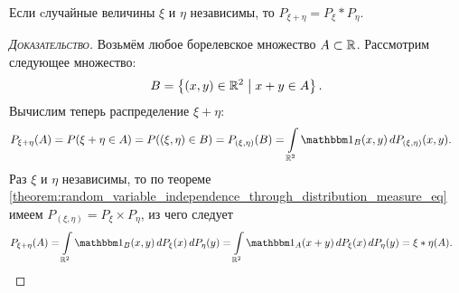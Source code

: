 \documentclass[../main.tex]{subfiles}
\begin{document}
\begin{thm}
 \label{theorem:distribution_of_sum_is_measure_convolution}
 Если cлучайные величины $ \xi $ и $ \eta $ независимы, то $ P_{\xi + \eta} = P_\xi \ast P_\eta $.
\end{thm}
\begin{proof}[\normalfont\textsc{Доказательство}]
 Возьмём любое борелевское множество $ A \subset \mathbb{R} $. Рассмотрим следующее множество:
 \begin{align*}
  B = \left\{ (x, y) \in \mathbb{R}^{2} \;\middle|\; x + y \in A \right\}.
 \end{align*} Вычислим теперь распределение $ \xi + \eta $:
 \begin{align*}
  P_{\xi+\eta}(A) &= P(\xi + \eta \in A) = P((\xi,\eta)\in B) = P_{(\xi,\eta)}(B) = \int\limits_{\R^{2}} \Ind_B(x,y) \,dP_{(\xi,\eta)}(x,y).
 \end{align*} Раз $ \xi $ и $ \eta $ независимы, то по теореме \ref{theorem:random_variable_independence_through_distribution_measure_eq} имеем $ P_{(\xi,\eta)} = P_\xi \times P_\eta $, из чего следует
 \begin{align*}
  P_{\xi+\eta}(A) &= \int\limits_{\R^{2}} \Ind_B(x,y)\,dP_\xi(x)\,dP_\eta(y) = \int\limits_{\R^{2}} \Ind_A(x + y) \,dP_\xi(x)\, dP_\eta(y) = \xi \ast \eta(A).
 \end{align*} 
\end{proof}
\end{document}
